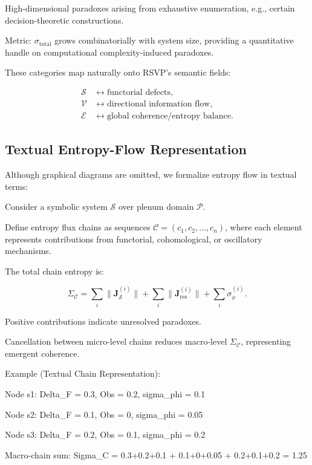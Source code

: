 \documentclass[12pt]{article}
\theoremstyle{plain}
\begin{document}
High-dimensional paradoxes arising from exhaustive enumeration, e.g., certain decision-theoretic constructions.

Metric: \(\sigma_{\mathrm{total}}\) grows combinatorially with system size, providing a quantitative handle on computational complexity-induced paradoxes.

These categories map naturally onto RSVP’s semantic fields:

\begin{align*}
\mathcal{S} &\longleftrightarrow \text{functorial defects},\\
\mathcal{V} &\longleftrightarrow \text{directional information flow},\\
\mathcal{E} &\longleftrightarrow \text{global coherence/entropy balance}.
\end{align*}

\subsection{Textual Entropy-Flow Representation}

Although graphical diagrams are omitted, we formalize entropy flow in textual terms:

Consider a symbolic system \(\mathcal{S}\) over plenum domain \(\mathcal{P}\).

Define entropy flux chains as sequences \(\mathcal{C} = (c_1, c_2, \dots, c_n)\), where each element represents contributions from functorial, cohomological, or oscillatory mechanisms.

The total chain entropy is:

\begin{equation}
\Sigma_\mathcal{C} = \sum_i \|\mathbf{J}_\mathcal{S}^{(i)}\| + \sum_i \|\mathbf{J}_{\mathrm{res}}^{(i)}\| + \sum_i \sigma_\phi^{(i)}.
\end{equation}

Positive contributions indicate unresolved paradoxes.

Cancellation between micro-level chains reduces macro-level \(\Sigma_\mathcal{C}\), representing emergent coherence.

Example (Textual Chain Representation):

Node s1: Delta_F = 0.3, Obs = 0.2, sigma_phi = 0.1

Node s2: Delta_F = 0.1, Obs = 0, sigma_phi = 0.05

Node s3: Delta_F = 0.2, Obs = 0.1, sigma_phi = 0.2

Macro-chain sum: Sigma_C = 0.3+0.2+0.1 + 0.1+0+0.05 + 0.2+0.1+0.2 = 1.25
\end{document}
